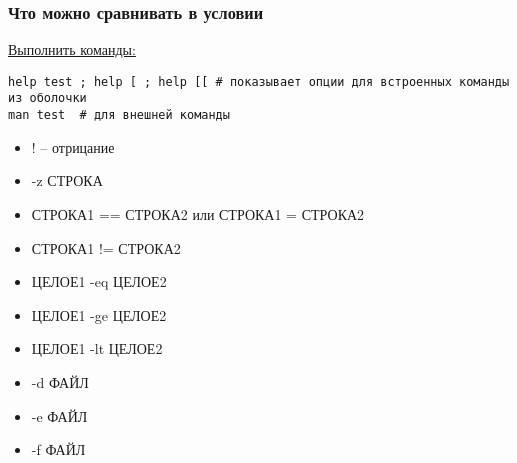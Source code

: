 \begin{frame}[fragile]
\frametitle{Что можно сравнивать в условии}

\underline{Выполнить команды:}
	\small\begin{lstlisting}
help test ; help [ ; help [[ # показывает опции для встроенных команды из оболочки
man test  # для внешней команды
	\end{lstlisting}
    \pause
	\begin{itemize}
	    \item \alert{!} -- отрицание
	    \item \alert{-z} СТРОКА
	    \item СТРОКА1 \alert{==} СТРОКА2 или СТРОКА1 \alert{=} СТРОКА2
	    \item СТРОКА1 \alert{!=} СТРОКА2
	    \item ЦЕЛОЕ1 \alert{-eq} ЦЕЛОЕ2
	    \item ЦЕЛОЕ1 \alert{-ge} ЦЕЛОЕ2
	    \item ЦЕЛОЕ1 \alert{-lt} ЦЕЛОЕ2
	    \item \alert{-d} ФАЙЛ
	    \item \alert{-e} ФАЙЛ
	    \item \alert{-f} ФАЙЛ
	\end{itemize}

\end{frame}
